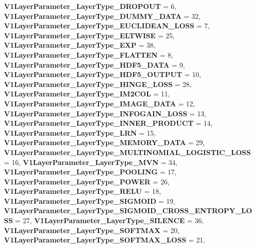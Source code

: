 \begin{DoxyCompactItemize}
{\bfseries V1\+Layer\+Parameter\+\_\+\+Layer\+Type\+\_\+\+D\+R\+O\+P\+O\+UT} = 6, 
{\bfseries V1\+Layer\+Parameter\+\_\+\+Layer\+Type\+\_\+\+D\+U\+M\+M\+Y\+\_\+\+D\+A\+TA} = 32, 
\newline
{\bfseries V1\+Layer\+Parameter\+\_\+\+Layer\+Type\+\_\+\+E\+U\+C\+L\+I\+D\+E\+A\+N\+\_\+\+L\+O\+SS} = 7, 
{\bfseries V1\+Layer\+Parameter\+\_\+\+Layer\+Type\+\_\+\+E\+L\+T\+W\+I\+SE} = 25, 
{\bfseries V1\+Layer\+Parameter\+\_\+\+Layer\+Type\+\_\+\+E\+XP} = 38, 
{\bfseries V1\+Layer\+Parameter\+\_\+\+Layer\+Type\+\_\+\+F\+L\+A\+T\+T\+EN} = 8, 
\newline
{\bfseries V1\+Layer\+Parameter\+\_\+\+Layer\+Type\+\_\+\+H\+D\+F5\+\_\+\+D\+A\+TA} = 9, 
{\bfseries V1\+Layer\+Parameter\+\_\+\+Layer\+Type\+\_\+\+H\+D\+F5\+\_\+\+O\+U\+T\+P\+UT} = 10, 
{\bfseries V1\+Layer\+Parameter\+\_\+\+Layer\+Type\+\_\+\+H\+I\+N\+G\+E\+\_\+\+L\+O\+SS} = 28, 
{\bfseries V1\+Layer\+Parameter\+\_\+\+Layer\+Type\+\_\+\+I\+M2\+C\+OL} = 11, 
\newline
{\bfseries V1\+Layer\+Parameter\+\_\+\+Layer\+Type\+\_\+\+I\+M\+A\+G\+E\+\_\+\+D\+A\+TA} = 12, 
{\bfseries V1\+Layer\+Parameter\+\_\+\+Layer\+Type\+\_\+\+I\+N\+F\+O\+G\+A\+I\+N\+\_\+\+L\+O\+SS} = 13, 
{\bfseries V1\+Layer\+Parameter\+\_\+\+Layer\+Type\+\_\+\+I\+N\+N\+E\+R\+\_\+\+P\+R\+O\+D\+U\+CT} = 14, 
{\bfseries V1\+Layer\+Parameter\+\_\+\+Layer\+Type\+\_\+\+L\+RN} = 15, 
\newline
{\bfseries V1\+Layer\+Parameter\+\_\+\+Layer\+Type\+\_\+\+M\+E\+M\+O\+R\+Y\+\_\+\+D\+A\+TA} = 29, 
{\bfseries V1\+Layer\+Parameter\+\_\+\+Layer\+Type\+\_\+\+M\+U\+L\+T\+I\+N\+O\+M\+I\+A\+L\+\_\+\+L\+O\+G\+I\+S\+T\+I\+C\+\_\+\+L\+O\+SS} = 16, 
{\bfseries V1\+Layer\+Parameter\+\_\+\+Layer\+Type\+\_\+\+M\+VN} = 34, 
{\bfseries V1\+Layer\+Parameter\+\_\+\+Layer\+Type\+\_\+\+P\+O\+O\+L\+I\+NG} = 17, 
\newline
{\bfseries V1\+Layer\+Parameter\+\_\+\+Layer\+Type\+\_\+\+P\+O\+W\+ER} = 26, 
{\bfseries V1\+Layer\+Parameter\+\_\+\+Layer\+Type\+\_\+\+R\+E\+LU} = 18, 
{\bfseries V1\+Layer\+Parameter\+\_\+\+Layer\+Type\+\_\+\+S\+I\+G\+M\+O\+ID} = 19, 
{\bfseries V1\+Layer\+Parameter\+\_\+\+Layer\+Type\+\_\+\+S\+I\+G\+M\+O\+I\+D\+\_\+\+C\+R\+O\+S\+S\+\_\+\+E\+N\+T\+R\+O\+P\+Y\+\_\+\+L\+O\+SS} = 27, 
\newline
{\bfseries V1\+Layer\+Parameter\+\_\+\+Layer\+Type\+\_\+\+S\+I\+L\+E\+N\+CE} = 36, 
{\bfseries V1\+Layer\+Parameter\+\_\+\+Layer\+Type\+\_\+\+S\+O\+F\+T\+M\+AX} = 20, 
{\bfseries V1\+Layer\+Parameter\+\_\+\+Layer\+Type\+\_\+\+S\+O\+F\+T\+M\+A\+X\+\_\+\+L\+O\+SS} = 21, 

\end{DoxyCompactItemize}
